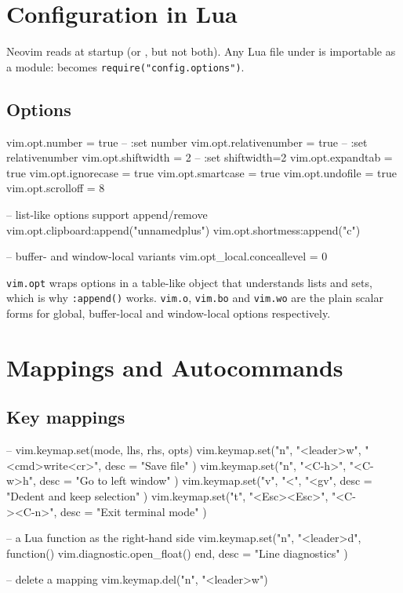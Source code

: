 \section{Configuration in Lua}\label{sec:nvim-lua}

Neovim reads  at startup (or
, but not both). Any Lua file under
 is importable as a module:
 becomes \texttt{require("config.options")}.

\subsection{Options}

\begin{luacode}
vim.opt.number = true            -- :set number
vim.opt.relativenumber = true    -- :set relativenumber
vim.opt.shiftwidth = 2           -- :set shiftwidth=2
vim.opt.expandtab = true
vim.opt.ignorecase = true
vim.opt.smartcase = true
vim.opt.undofile = true
vim.opt.scrolloff = 8

-- list-like options support append/remove
vim.opt.clipboard:append("unnamedplus")
vim.opt.shortmess:append("c")

-- buffer- and window-local variants
vim.opt_local.conceallevel = 0
\end{luacode}

\begin{note}
	\texttt{vim.opt} wraps options in a table-like object that understands lists
	and sets, which is why \texttt{:append()} works. \texttt{vim.o},
	\texttt{vim.bo} and \texttt{vim.wo} are the plain scalar forms for global,
	buffer-local and window-local options respectively.
\end{note}

\section{Mappings and Autocommands}\label{sec:nvim-keymaps}

\subsection{Key mappings}

\begin{luacode}
-- vim.keymap.set(mode, lhs, rhs, opts)
vim.keymap.set("n", "<leader>w", "<cmd>write<cr>", { desc = "Save file" })
vim.keymap.set("n", "<C-h>", "<C-w>h", { desc = "Go to left window" })
vim.keymap.set("v", "<", "<gv", { desc = "Dedent and keep selection" })
vim.keymap.set("t", "<Esc><Esc>", "<C-\\><C-n>", { desc = "Exit terminal mode" })

-- a Lua function as the right-hand side
vim.keymap.set("n", "<leader>d", function()
  vim.diagnostic.open_float()
end, { desc = "Line diagnostics" })

-- delete a mapping
vim.keymap.del("n", "<leader>w")
\end{luacode}

